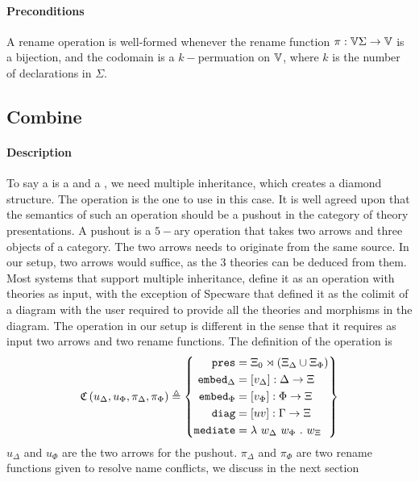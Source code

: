 \paragraph{Preconditions}
A rename operation is well-formed whenever the rename function $\pi : \mathbb{V}{\Sigma} \to \mathbb{V}$ is a bijection, and the codomain is a $k-$permuation on $\mathbb{V}$, where $k$ is the number of declarations in $\Sigma$. 

\subsection{Combine}
\label{subsec:combine}
\paragraph{Description}
To say a  is a  and a , we need multiple inheritance, which creates a diamond structure. The  operation is the one to use in this case. It is well agreed upon that the semantics of such an operation should be a pushout in the category of theory presentations. A pushout is a $5-$ary operation that takes two arrows and three objects of a category. The two arrows needs to originate from the same source. In our setup, two arrows would suffice, as the $3$ theories can be deduced from them. Most systems that support multiple inheritance, define it as an operation with theories as input, with the exception of Specware that defined it as the colimit of a diagram with the user required to provide all the theories and morphisms in the diagram. The  operation in our setup is different in the sense that it requires as input two arrows and two rename functions. The definition of the operation is 
\[
\comfun\left( u_{\Delta}, u_{\Phi}, \pi_{\Delta}, \pi_{\Phi}\right) \define
\left\{\begin{aligned}
\mathtt{pres} & = \combineResult_0\rtimes\left(\combineResult_{\Delta} \cup \combineResult_{\Phi}\right) \\
\mathtt{embed}_{\Delta} & = \left[v_{\Delta}\right] : \Delta\rightarrow\combineResult\\
\mathtt{embed}_{\Phi} & = \left[v_{\Phi}\right] : \Phi\rightarrow\combineResult\\
\mathtt{diag} & = \left[uv\right]:\Gamma\rightarrow\combineResult\\
\mathtt{mediate} & = \lambda\ w_{\Delta}\ w_{\Phi}\ .\  w_{\combineResult}
\end{aligned}\right\}\]
$u_{\Delta}$ and $u_{\Phi}$ are the two arrows for the pushout. $\pi_{\Delta}$ and $\pi_{\Phi}$ are two rename functions given to resolve name conflicts, we discuss in the next section 

